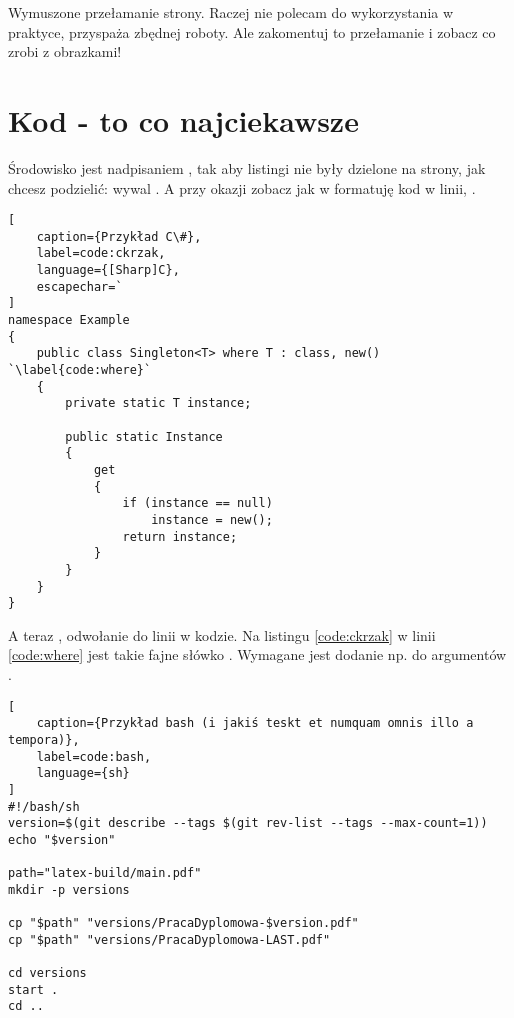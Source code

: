 Wymuszone przełamanie strony. Raczej nie polecam do wykorzystania w praktyce, przyspaża zbędnej roboty.
Ale zakomentuj to przełamanie i zobacz co zrobi z obrazkami!
\clearpage %

\section{Kod - to co najciekawsze}

Środowisko  jest nadpisaniem , tak aby listingi nie były dzielone na strony, jak chcesz podzielić: wywal .
A przy okazji zobacz jak w  formatuję kod w linii, .

\begin{onepage}
    \begin{lstlisting}[
    caption={Przykład C\#},
    label=code:ckrzak,
    language={[Sharp]C},
    escapechar=`
]
namespace Example
{
    public class Singleton<T> where T : class, new() `\label{code:where}`
    {
        private static T instance;

        public static Instance
        {
            get
            {
                if (instance == null)
                    instance = new();
                return instance;
            }
        }
    }
}
\end{lstlisting}
\end{onepage}

A teraz , odwołanie do linii w kodzie. Na listingu \ref{code:ckrzak} w linii \ref{code:where} jest takie fajne słówko . Wymagane jest dodanie np.  do argumentów .

\begin{onepage}
    \begin{lstlisting}[
    caption={Przykład bash (i jakiś teskt et numquam omnis illo a tempora)},
    label=code:bash,
    language={sh}
]
#!/bash/sh
version=$(git describe --tags $(git rev-list --tags --max-count=1))
echo "$version"

path="latex-build/main.pdf"
mkdir -p versions

cp "$path" "versions/PracaDyplomowa-$version.pdf"
cp "$path" "versions/PracaDyplomowa-LAST.pdf"

cd versions
start .
cd ..
\end{lstlisting}
\end{onepage}
